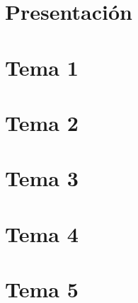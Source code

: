\documentclass[fontsize=10pt,twoside=true,secnumdepth=1]{kaobook}
\begin{document}
\chapter*{Presentación}
\blindtext
%
\begingroup %
%
\setlength{\textheight}{230\vscale} %
%
\etocstandarddisplaystyle %
\etocstandardlines %
%
\tableofcontents %
%
\listoffigures %
%
\let\cleardoublepage\bigskip
\let\clearpage\bigskip
%
\listoftables %
%
\endgroup

% 
%
\mainmatter %
%
%

\chapter{Tema 1}
\blindtext
\chapter{Tema 2}
\blindtext
\chapter{Tema 3}
\blindtext
\chapter{Tema 4}
%

\chapter{Tema 5}
\blindtext
\end{document}
